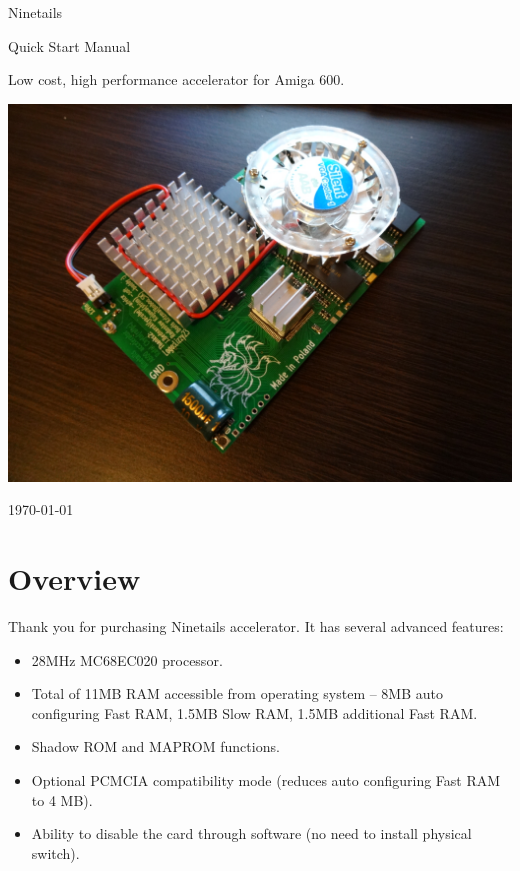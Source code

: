 \documentclass[10pt,a4paper]{article}
\begin{document}
\begin{titlepage}
\begin{center}

\Huge
Ninetails

Quick Start Manual

\vspace*{2cm}

\normalsize
Low cost, high performance accelerator for Amiga 600.

\vspace*{2cm}
\includegraphics[scale=0.25]{ninetails-photo.jpg}
\vfill

\normalsize
\today

\end{center}
\end{titlepage}

\section*{Overview}

Thank you for purchasing Ninetails accelerator. It has several advanced features:

\begin{itemize}
	\item 28MHz MC68EC020 processor.
	\item Total of 11MB RAM accessible from operating system -- 8MB auto configuring Fast RAM, 1.5MB Slow RAM, 1.5MB additional Fast RAM.
	\item Shadow ROM and MAPROM functions.
	\item Optional PCMCIA compatibility mode (reduces auto configuring Fast RAM to 4 MB).
	\item Ability to disable the card through software (no need to install physical switch).
\end{itemize}
\end{document}
